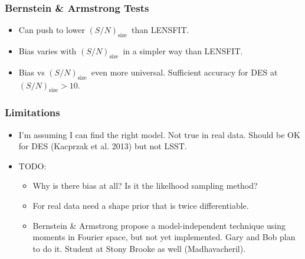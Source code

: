 \documentclass{beamer}
\newcommand{\snT}{$(S/N)_{\textrm{size}}$}
\begin{document}

\frame
{
    
    \frametitle{Bernstein \& Armstrong Tests}

    \begin{itemize}
        \item Can push to lower \snT\ than LENSFIT.

        \item Bias varies with \snT\ in a simpler way than LENSFIT.
        \item Bias vs \snT\ even more universal. Sufficient accuracy for DES at \snT$ > 10$.

       

    \end{itemize}
}

\frame
{
    \frametitle{Limitations}
    \begin{itemize}

        \item I'm assuming I can find the right model.  Not true in real data.
            Should be OK for DES (Kacprzak et al. 2013) but not LSST.

        \item TODO: 
            
            \begin{itemize}

                \item Why is there bias at all?  Is it the likelhood sampling
                    method?

                \item For real data need a shape prior that is twice
                    differentiable.

                \item Bernstein \& Armstrong propose a model-independent
                    technique using moments in Fourier space, but not yet
                    implemented.  Gary and Bob plan to do it.  Student at Stony
                    Brooke as well (Madhavacheril).

            \end{itemize}

    \end{itemize}
}
\end{document}
